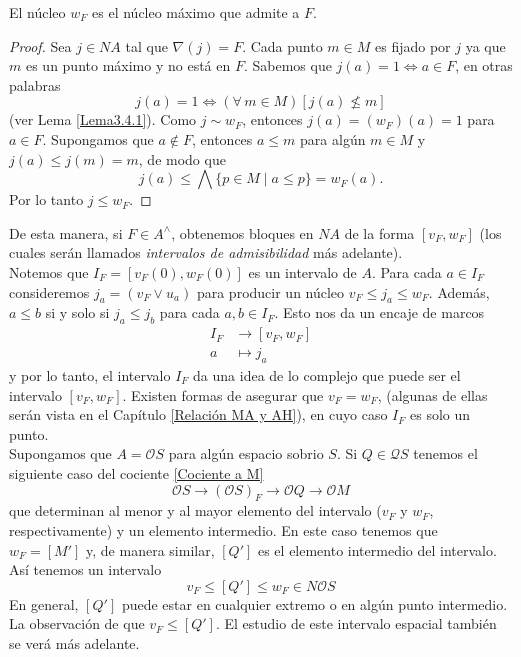 \begin{lem}
    El núcleo $w_F$ es el núcleo máximo que admite a $F$. 
\end{lem}

\begin{proof}
    Sea $j\in NA$ tal que $\nabla (j)=F$. Cada punto $m\in M$ es fijado por $j$ ya que $m$ es un punto máximo y no está en $F$. Sabemos que $j(a)=1\Leftrightarrow a\in F$, en otras palabras 
    \[
    j(a)=1\Leftrightarrow (\forall \, m\in M)[j(a)\nleq m] 
    \]
    (ver Lema \ref{Lema3.4.1}). Como $j\sim w_F$, entonces $j(a)=(w_F)(a)=1$ para $a\in F$. Supongamos que $a\notin F$, entonces $a\leq m$ para algún $m\in M$ y $j(a)\leq j(m)=m$, de modo que 
    \[
    j(a)\leq \bigwedge \{p\in M\mid a\leq p\}=w_F(a).
    \]
    Por lo tanto $j\leq w_F$.
\end{proof}

De esta manera, si $F\in A^\wedge$, obtenemos bloques en $NA$ de la forma $[v_F, w_F]$ (los cuales serán llamados \emph{intervalos de admisibilidad} más adelante).\\

Notemos que $I_F=[v_F(0), w_F(0)]$ es un intervalo de $A$. Para cada $a\in I_F$ consideremos $j_a=(v_F\vee u_a)$ para producir un núcleo $v_F\leq j_a\leq w_F$. Además, $a\leq b$ si y solo si $j_a\leq j_b$ para cada $a, b\in I_F$. Esto nos da un encaje de marcos 
\[
\begin{split}
    I_F &\to [v_F, w_F]\\
    a & \mapsto j_a
\end{split}
\]
y por lo tanto, el intervalo $I_F$ da una idea de lo complejo que puede ser el intervalo $[v_F, w_F]$. Existen formas de asegurar que $v_F=w_F$, (algunas de ellas serán vista en el Capítulo \ref{Relación MA y AH}), en cuyo caso $I_F$ es solo un punto.\\

Supongamos que $A=\mathcal{O}S$ para algún espacio sobrio $S$. Si $Q\in \mathcal{Q}S$ tenemos el siguiente caso del cociente \ref{Cociente a M} 
\begin{equation}\label{Cociente espacial a M}
\mathcal{O}S\to (\mathcal{O}S)_F\to \mathcal{O}Q\to \mathcal{O}M
\end{equation}
que determinan al menor y al mayor elemento del intervalo ($v_F$ y $w_F$, respectivamente) y un elemento intermedio. En este caso tenemos que $w_F=[M']$ y, de manera similar, $[Q']$ es el elemento intermedio del intervalo. Así tenemos un intervalo 
\[
v_F\leq [Q']\leq w_F\in N\mathcal{O}S
\]
En general, $[Q']$ puede estar en cualquier extremo o en algún punto intermedio. La observación de que $v_F\leq [Q']$. El estudio de este intervalo espacial también se verá más adelante.\\

